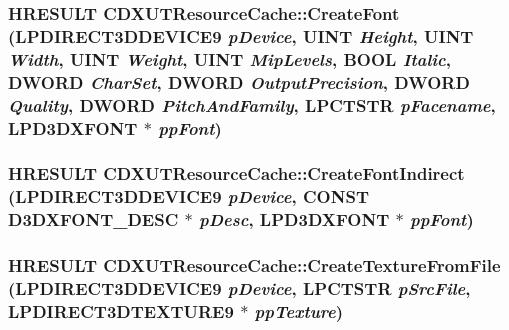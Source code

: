\label{class_c_d_x_u_t_resource_cache_a6bc96eb215a1888bdcbffcbb63e45f6d}
\hypertarget{class_c_d_x_u_t_resource_cache_a55e34fa53a7d702d20a20e6c79acd945}{
\subsubsection[{CreateFont}]{\setlength{\rightskip}{0pt plus 5cm}HRESULT CDXUTResourceCache::CreateFont (LPDIRECT3DDEVICE9 {\em pDevice}, \/  UINT {\em Height}, \/  UINT {\em Width}, \/  UINT {\em Weight}, \/  UINT {\em MipLevels}, \/  BOOL {\em Italic}, \/  DWORD {\em CharSet}, \/  DWORD {\em OutputPrecision}, \/  DWORD {\em Quality}, \/  DWORD {\em PitchAndFamily}, \/  LPCTSTR {\em pFacename}, \/  LPD3DXFONT $\ast$ {\em ppFont})}}
\label{class_c_d_x_u_t_resource_cache_a55e34fa53a7d702d20a20e6c79acd945}
\hypertarget{class_c_d_x_u_t_resource_cache_ac3dc49f6b373324035d0833257b1501e}{
\subsubsection[{CreateFontIndirect}]{\setlength{\rightskip}{0pt plus 5cm}HRESULT CDXUTResourceCache::CreateFontIndirect (LPDIRECT3DDEVICE9 {\em pDevice}, \/  CONST D3DXFONT\_\-DESC $\ast$ {\em pDesc}, \/  LPD3DXFONT $\ast$ {\em ppFont})}}
\label{class_c_d_x_u_t_resource_cache_ac3dc49f6b373324035d0833257b1501e}
\hypertarget{class_c_d_x_u_t_resource_cache_a682c9c2045cc661670d98412deb5f4ef}{
\subsubsection[{CreateTextureFromFile}]{\setlength{\rightskip}{0pt plus 5cm}HRESULT CDXUTResourceCache::CreateTextureFromFile (LPDIRECT3DDEVICE9 {\em pDevice}, \/  LPCTSTR {\em pSrcFile}, \/  LPDIRECT3DTEXTURE9 $\ast$ {\em ppTexture})}}
\label{class_c_d_x_u_t_resource_cache_a682c9c2045cc661670d98412deb5f4ef}
